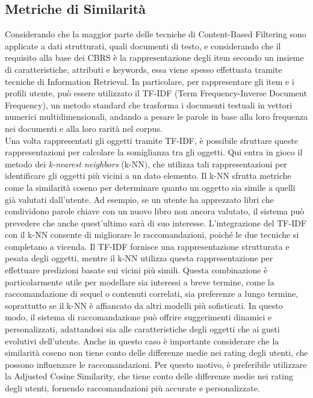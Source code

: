 \documentclass{report}
\begin{document}
	\subsection{Metriche di Similarità}
	Considerando che la maggior parte delle tecniche di Content-Based Filtering sono applicate a dati strutturati, quali documenti di testo, e considerando che il requisito alla base dei CBRS è la rappresentazione degli item secondo un insieme di caratteristiche, attributi e keywords, essa viene spesso effettuata tramite tecniche di Information Retrieval. In particolare, per rappresentare gli item e i profili utente, può essere utilizzato il TF-IDF (Term Frequency-Inverse Document Frequency), un metodo standard che trasforma i documenti testuali in vettori numerici multidimensionali, andando a pesare le parole in base alla loro frequenza nei documenti e alla loro rarità nel corpus.
	\vspace{\baselineskip}\\
	Una volta rappresentati gli oggetti tramite TF-IDF, è possibile sfruttare queste rappresentazioni per calcolare la somiglianza tra gli oggetti. Qui entra in gioco il metodo dei \textit{k-nearest neighbors} (k-NN), che utilizza tali rappresentazioni per identificare gli oggetti più vicini a un dato elemento. Il k-NN sfrutta metriche come la similarità coseno per determinare quanto un oggetto sia simile a quelli già valutati dall'utente. Ad esempio, se un utente ha apprezzato libri che condividono parole chiave con un nuovo libro non ancora valutato, il sistema può prevedere che anche quest'ultimo sarà di suo interesse. L'integrazione del TF-IDF con il k-NN consente di migliorare le raccomandazioni, poiché le due tecniche si completano a vicenda. Il TF-IDF fornisce una rappresentazione strutturata e pesata degli oggetti, mentre il k-NN utilizza questa rappresentazione per effettuare predizioni basate sui vicini più simili. Questa combinazione è particolarmente utile per modellare sia interessi a breve termine, come la raccomandazione di sequel o contenuti correlati, sia preferenze a lungo termine, soprattutto se il k-NN è affiancato da altri modelli più sofisticati. In questo modo, il sistema di raccomandazione può offrire suggerimenti dinamici e personalizzati, adattandosi sia alle caratteristiche degli oggetti che ai gusti evolutivi dell'utente.	Anche in questo caso è importante considerare che la similarità coseno non tiene conto delle differenze medie nei rating degli utenti, che possono influenzare le raccomandazioni. Per questo motivo, è preferibile utilizzare la Adjusted Cosine Similarity, che tiene conto delle differenze medie nei rating degli utenti, fornendo raccomandazioni più accurate e personalizzate.
\end{document}
